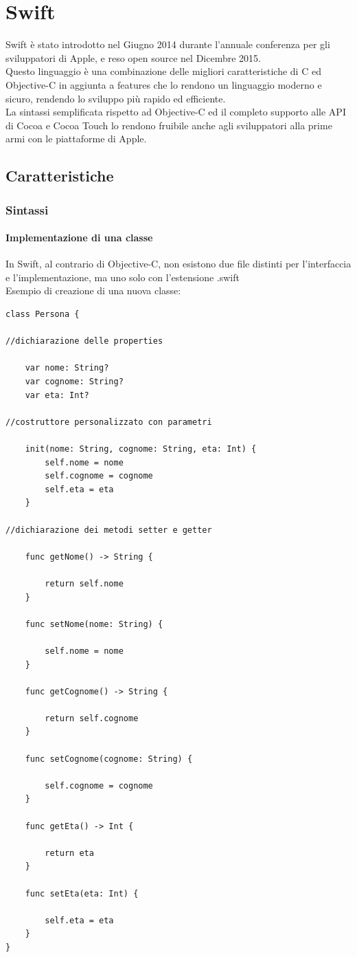 \chapter{Swift}
Swift è stato introdotto nel Giugno 2014 durante l'annuale conferenza per gli sviluppatori di Apple, e reso open source nel Dicembre 2015.\\
Questo linguaggio è una combinazione delle migliori caratteristiche di C ed Objective-C in aggiunta a features che lo rendono un linguaggio moderno e sicuro, rendendo lo sviluppo più rapido ed efficiente.\\La sintassi semplificata rispetto ad Objective-C ed il completo supporto alle API di Cocoa e Cocoa Touch lo rendono fruibile anche agli sviluppatori alla prime armi con le piattaforme di Apple.
\section{Caratteristiche}
\subsection{Sintassi}
\subsubsection{Implementazione di una classe}
In Swift, al contrario di Objective-C, non esistono due file distinti per l'interfaccia e l'implementazione, ma uno solo con l'estensione .swift\\
Esempio di creazione di una nuova classe:\\
\lstset{language=[Objective]C, breakindent=40pt, breaklines}
\begin{lstlisting}
class Persona { 

//dichiarazione delle properties

	var nome: String? 
	var cognome: String? 
	var eta: Int?

//costruttore personalizzato con parametri 

	init(nome: String, cognome: String, eta: Int) {
		self.nome = nome
		self.cognome = cognome
		self.eta = eta
	}

//dichiarazione dei metodi setter e getter 

	func getNome() -> String {

		return self.nome
	}

	func setNome(nome: String) {

		self.nome = nome
	}

	func getCognome() -> String {

		return self.cognome
	}

	func setCognome(cognome: String) {
	
		self.cognome = cognome
	}

	func getEta() -> Int {
	
		return eta
	}

	func setEta(eta: Int) {

		self.eta = eta
	}
}
\end{lstlisting}
